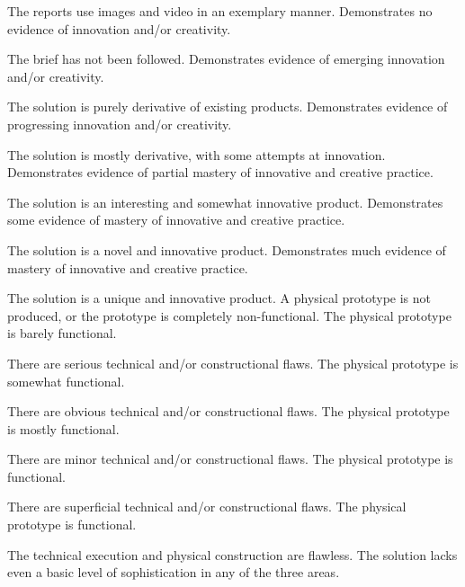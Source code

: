 \documentclass{../fal_assignment}
\begin{document}
\begin{markingrubric}
            \par The reports use images and video in an exemplary manner.
        \grade\fail Demonstrates no evidence of innovation and/or creativity.
            \par The brief has not been followed.
        \grade Demonstrates evidence of emerging innovation and/or creativity.
            \par The solution is purely derivative of existing products.
        \grade Demonstrates evidence of progressing innovation and/or creativity.
            \par The solution is mostly derivative, with some attempts at innovation.
        \grade Demonstrates evidence of partial mastery of innovative and creative practice.
            \par The solution is an interesting and somewhat innovative product.
        \grade Demonstrates some evidence of mastery of innovative and creative practice.
            \par The solution is a novel and innovative product.
        \grade Demonstrates much evidence of mastery of innovative and creative practice.
            \par The solution is a unique and innovative product.
        \grade\fail A physical prototype is not produced, or the prototype is completely non-functional.
        \grade The physical prototype is barely functional.
            \par There are serious technical and/or constructional flaws.
        \grade The physical prototype is somewhat functional.
            \par There are obvious technical and/or constructional flaws.
        \grade The physical prototype is mostly functional.
            \par There are minor technical and/or constructional flaws.
        \grade The physical prototype is functional.
            \par There are superficial technical and/or constructional flaws.
        \grade The physical prototype is functional.
            \par The technical execution and physical construction are flawless.
        \grade\fail The solution lacks even a basic level of sophistication in any of the three areas.

\end{markingrubric}
\end{document}
